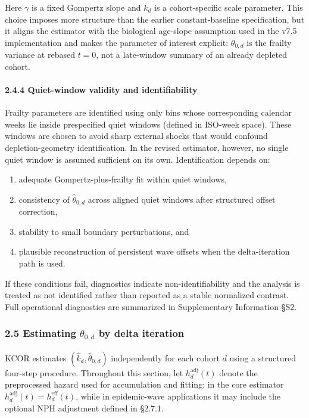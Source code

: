 \documentclass[
]{article}
\providecommand{\tightlist}{%
  \setlength{\itemsep}{0pt}\setlength{\parskip}{0pt}}
\begin{document}
Here \(\gamma\) is a fixed Gompertz slope and \(k_d\) is a
cohort-specific scale parameter. This choice imposes more structure than
the earlier constant-baseline specification, but it aligns the estimator
with the biological age-slope assumption used in the v7.5 implementation
and makes the parameter of interest explicit: \(\theta_{0,d}\) is the
frailty variance at rebased \(t=0\), not a late-window summary of an
already depleted cohort.

\paragraph{2.4.4 Quiet-window validity and
identifiability}\label{quiet-window-validity-and-identifiability}

Frailty parameters are identified using only bins whose corresponding
calendar weeks lie inside prespecified quiet windows (defined in
ISO-week space). These windows are chosen to avoid sharp external shocks
that would confound depletion-geometry identification. In the revised
estimator, however, no single quiet window is assumed sufficient on its
own. Identification depends on:

\begin{enumerate}
\def\labelenumi{\arabic{enumi}.}
\tightlist
\item
  adequate Gompertz-plus-frailty fit within quiet windows,
\item
  consistency of \(\hat{\theta}_{0,d}\) across aligned quiet windows
  after structured offset correction,
\item
  stability to small boundary perturbations, and
\item
  plausible reconstruction of persistent wave offsets when the
  delta-iteration path is used.
\end{enumerate}

If these conditions fail, diagnostics indicate non-identifiability and
the analysis is treated as not identified rather than reported as a
stable normalized contrast. Full operational diagnostics are summarized
in Supplementary Information §S2.

\subsubsection{\texorpdfstring{2.5 Estimating \(\theta_{0,d}\) by delta
iteration}{2.5 Estimating \textbackslash theta\_\{0,d\} by delta iteration}}\label{estimating-theta_0d-by-delta-iteration}

KCOR estimates \((\hat{k}_d,\hat{\theta}_{0,d})\) independently for each
cohort \(d\) using a structured four-step procedure. Throughout this
section, let \(h_d^{\mathrm{adj}}(t)\) denote the preprocessed hazard
used for accumulation and fitting: in the core estimator
\(h_d^{\mathrm{adj}}(t)=h_d^{\mathrm{eff}}(t)\), while in epidemic-wave
applications it may include the optional NPH adjustment defined in
§2.7.1.
\end{document}
